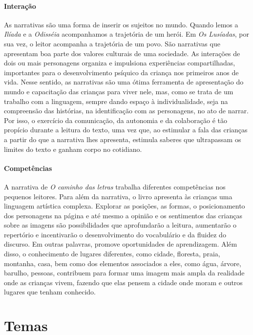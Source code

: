 \documentclass[11pt]{extarticle}
\begin{document}
\paragraph{Interação} 
As narrativas são uma forma de inserir os sujeitos no mundo. Quando lemos a \textit{Ilíada} e a \textit{Odisséia} acompanhamos a trajetória de um herói. Em \textit{Os Lusíadas}, por sua vez, o leitor acompanha a trajetória de um povo. São narrativas que apresentam boa parte dos valores culturais de uma sociedade. As interações de dois ou mais personagens organiza e impulsiona experiências compartilhadas, importantes para o desenvolvimento psíquico da criança nos primeiros anos de vida. Nesse sentido, as narrativas são uma ótima ferramenta de apresentação do mundo e capacitação das crianças para viver nele, mas, como se trata de um trabalho com a linguagem, sempre dando espaço à individualidade, seja na compreensão das histórias, na identificação com as personagens, no ato de narrar. Por isso, o exercício da comunicação, da autonomia e da colaboração é tão propício durante a leitura do texto, uma vez que, ao estimular a fala das crianças a partir do que a narrativa lhes apresenta, estimula saberes que ultrapassam os limites do texto e ganham corpo no cotidiano.


\paragraph{Competências} 
A narrativa de \textit{O caminho das letras} trabalha diferentes competências nos pequenos leitores. Para além da narrativa, o livro apresenta às crianças uma linguagem artística complexa. Explorar as posições, as formas, o posicionamento dos personagens na página e até mesmo a opinião e os sentimentos das crianças sobre as imagens são possibilidades que aprofundarão a leitura, aumentarão o repertório e incentivarão o desenvolvimento do vocabulário e da fluidez do discurso. Em outras palavras, promove oportunidades de aprendizagem. Além disso, o conhecimento de lugares diferentes, como cidade, floresta, praia, montanha, casa, bem como dos elementos associados a eles, como água, árvore, barulho, pessoas, contribuem para formar uma imagem mais ampla da realidade onde as crianças vivem, fazendo que elas pensem a cidade onde moram e outros lugares que tenham conhecido. 

\section{Temas}
\end{document}
